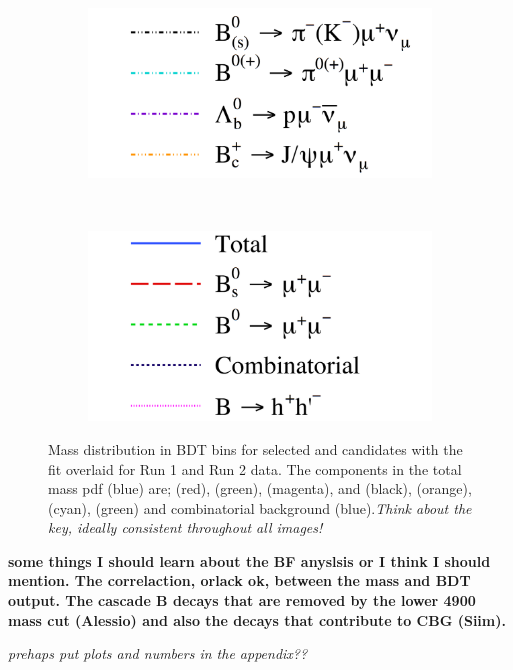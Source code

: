 \begin{figure}[htbp]
    \begin{subfigure}[b]{0.3\textwidth}
       \includegraphics[width=\textwidth]{./Figs/BFAnalysis/legendB.pdf}
    \end{subfigure}
    ~
    \begin{subfigure}[b]{0.3\textwidth}
       \includegraphics[width=\textwidth]{./Figs/BFAnalysis/LegendA.pdf}
    \end{subfigure}
    \caption{Mass distribution in BDT bins for selected \bsmumu and \bdmumu candidates with the fit overlaid for Run 1 and Run 2 data. The components in the total mass pdf (blue) are; \bsmumu (red), \bdmumu (green), \bhh (magenta), \bdpimunu and \bsKmunu (black), \bcjpsimunu (orange), \bpimumu (cyan), \lambdab (green) and combinatorial background (blue).{\it Think about the key, ideally consistent throughout all images! } }
    \label{fig:BFfit}
\end{figure}



{\bf some things I should learn about the BF anyslsis or I think I should mention. The correlaction, orlack ok, between the mass and BDT output. The cascade B decays that are removed by the lower 4900 mass cut (Alessio) and also the decays that contribute to CBG (Siim).}

{\it prehaps put plots and numbers in the appendix??}
